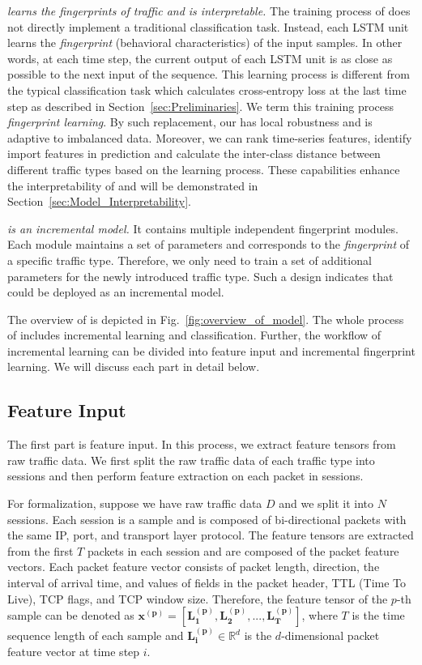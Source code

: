 \first \textit{\sys learns the fingerprints of traffic and is interpretable.}
The training process of \sys does not directly implement a traditional classification task. 
Instead, each LSTM unit learns the \emph{fingerprint} (behavioral characteristics) of the input samples. 
In other words, at each time step, the current output of each LSTM unit is as close as possible to the next input of the sequence. 
This learning process is different from the typical classification task which calculates cross-entropy loss at the last time step as described in Section~\ref{sec:Preliminaries}.
We term this training process \emph{fingerprint learning}. 
By such replacement, our \sys has local robustness and is adaptive to imbalanced data.
Moreover, we can rank time-series features, identify import features in prediction and calculate the inter-class distance between different traffic types based on the learning process. 
These capabilities enhance the interpretability of \sys and will be demonstrated in Section~\ref{sec:Model_Interpretability}. 

\second \textit{\sys is an incremental model.} 
It contains multiple independent fingerprint modules. 
Each module maintains a set of parameters and corresponds to the \emph{fingerprint} of a specific traffic type. 
Therefore, we only need to train a set of additional parameters for the newly introduced traffic type. 
Such a design indicates that \sys could be deployed as an incremental model. 

The overview of \sys is depicted in Fig.~\ref{fig:overview_of_model}. 
The whole process of \sys includes incremental learning and classification. 
Further, the workflow of incremental learning can be divided into feature input and incremental fingerprint learning. 
We will discuss each part in detail below.

\subsection{Feature Input}
The first part is feature input. 
In this process, we extract feature tensors from raw traffic data.
We first split the raw traffic data of each traffic type into sessions and then perform feature extraction on each packet in sessions.

For formalization, suppose we have raw traffic data $D$ and we split it into $N$ sessions.
Each session is a sample and is composed of bi-directional packets with the same IP, port, and transport layer protocol.
The feature tensors are extracted from the first $T$ packets in each session and are composed of the packet feature vectors. 
Each packet feature vector consists of packet length, direction, the interval of arrival time, and values of fields in the packet header, \eg TTL (Time To Live), TCP flags, and TCP window size. 
Therefore, the feature tensor of the $p$-th sample can be denoted as $\mathbf{x^{(p)}} = [\mathbf{L_1^{(p)}}, \mathbf{L_2^{(p)}}, ..., \mathbf{L_T^{(p)}}]$, where $T$ is the time sequence length of each sample and $\mathbf{L_i^{(p)}} \in \mathbb{R}^d$ is the $d$-dimensional packet feature vector at time step $i$. 

